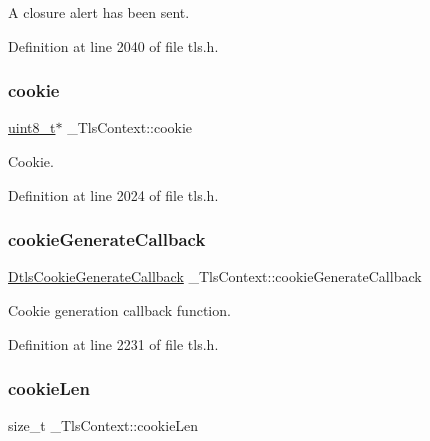 A closure alert has been sent. 



Definition at line 2040 of file tls.\+h.

\mbox{\label{struct__TlsContext_ac2bc6514bc9c6ba63956098a4d15b76a}} 
\subsubsection{\texorpdfstring{cookie}{cookie}}
{\footnotesize\ttfamily \hyperlink{stdint_8h_aba7bc1797add20fe3efdf37ced1182c5}{uint8\+\_\+t}$\ast$ \+\_\+\+Tls\+Context\+::cookie}



Cookie. 



Definition at line 2024 of file tls.\+h.

\mbox{\label{struct__TlsContext_a10acb70ff4325977104220fbe5406270}} 
\subsubsection{\texorpdfstring{cookie\+Generate\+Callback}{cookieGenerateCallback}}
{\footnotesize\ttfamily \hyperlink{dtls__misc_8h_a26c71101670183fb3f3a89aa3084800d}{Dtls\+Cookie\+Generate\+Callback} \+\_\+\+Tls\+Context\+::cookie\+Generate\+Callback}



Cookie generation callback function. 



Definition at line 2231 of file tls.\+h.

\mbox{\label{struct__TlsContext_a1dd10766ce7b503cb08e2ddc8ab18bca}} 
\subsubsection{\texorpdfstring{cookie\+Len}{cookieLen}}
{\footnotesize\ttfamily size\+\_\+t \+\_\+\+Tls\+Context\+::cookie\+Len}



